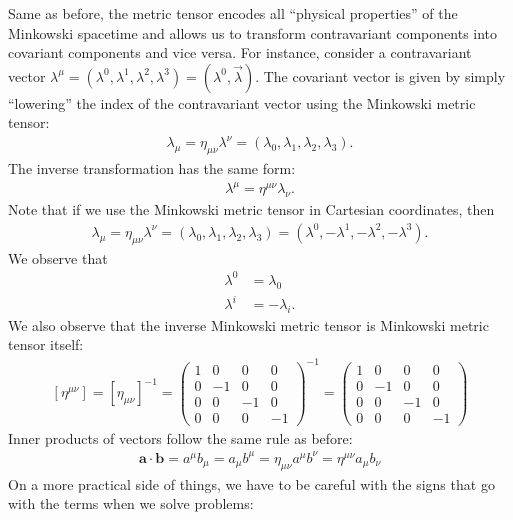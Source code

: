 \documentclass{book}
\theoremstyle{definition}
\begin{document}
Same as before, the metric tensor encodes all ``physical properties'' of the Minkowski spacetime and allows us to transform contravariant components into covariant components and vice versa. For instance, consider a contravariant vector $\lambda^\mu = (\lambda^0, \lambda^1, \lambda^2, \lambda^3) = (\lambda^0, \vec{\lambda})$. The covariant vector is given by simply ``lowering'' the index of the contravariant vector using the Minkowski metric tensor:
\begin{align*}
\lambda_\mu = \eta_{\mu\nu}\lambda^\nu = (\lambda_0, \lambda_1, \lambda_2, \lambda_3).
\end{align*}
The inverse transformation has the same form:
\begin{align*}
\lambda^\mu = \eta^{\mu\nu}\lambda_\nu.
\end{align*}
Note that if we use the Minkowski metric tensor in Cartesian coordinates, then
\begin{align*}
\lambda_\mu = \eta_{\mu\nu}\lambda^\nu = (\lambda_0, \lambda_1, \lambda_2, \lambda_3) = (\lambda^0, -\lambda^1, -\lambda^2, -\lambda^3).
\end{align*}
We observe that
\begin{align*}
\lambda^0 &= \lambda_0\\
\lambda^i &= -\lambda_i.
\end{align*}
We also observe that the inverse Minkowski metric tensor is Minkowski metric tensor itself:
\begin{align*}
\boxed{
[\eta^{\mu\nu}] = [\eta_{\mu\nu}]^{-1} 
= 
\begin{pmatrix}
1 & 0 & 0 & 0\\
0 & -1 & 0 & 0\\
0 & 0 & -1 & 0\\
0 & 0 & 0 & -1
\end{pmatrix}^{-1}
=
\begin{pmatrix}
1 & 0 & 0 & 0\\
0 & -1 & 0 & 0\\
0 & 0 & -1 & 0\\
0 & 0 & 0 & -1
\end{pmatrix}}
\end{align*}
Inner products of vectors follow the same rule as before:
\begin{align*}
\boxed{
\mathbf{a}\cdot\mathbf{b} = a^\mu b_\mu = a_\mu b^\mu = \eta_{\mu\nu}a^\mu b^\nu = \eta^{\mu\nu}a_\mu b_\nu}
\end{align*}
On a more practical side of things, we have to be careful with the signs that go with the terms when we solve problems:
\end{document}
